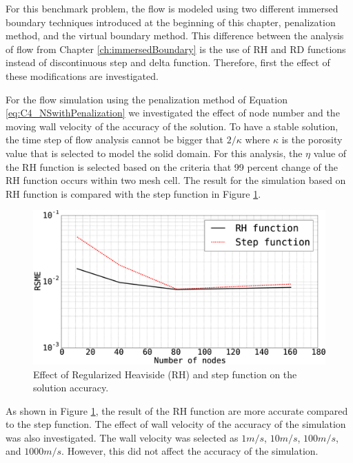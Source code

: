 For this benchmark problem, the flow is modeled using two different immersed boundary techniques introduced at the beginning of this chapter, penalization method, and the virtual boundary method. This difference between the analysis of flow from Chapter \ref{ch:immersedBoundary} is the use of RH and RD functions instead of discontinuous step and delta function. Therefore, first the effect of these modifications are investigated.

For the flow simulation using the penalization method of Equation \eqref{eq:C4_NSwithPenalization} we investigated the effect of node number and the moving wall velocity of the accuracy of the solution. To have a stable solution, the time step of flow analysis cannot be bigger that $2 / \kappa$ where $\kappa$ is the porosity value that is selected to model the solid domain. For this analysis, the $\eta$ value of the RH function is selected based on the criteria that 99 percent change of the RH function occurs within two mesh cell. The result for the simulation based on RH function is compared with the step function in Figure \ref{fig:C4_effectOfRHfunctionOnSimulationResults1Dproblem}.

\begin{figure}[H]
    \centering
    \includegraphics[width=12.00cm]{Chapter_4/figure/effect_of_RH_on_simulation_vs_numberOfNodes_1D_problem.eps}
    \caption{Effect of Regularized Heaviside (RH) and step function on the solution accuracy.}
    \label{fig:C4_effectOfRHfunctionOnSimulationResults1Dproblem}
\end{figure}

As shown in Figure \ref{fig:C4_effectOfRHfunctionOnSimulationResults1Dproblem}, the result of the RH function are more accurate compared to the step function. The effect of wall velocity of the accuracy of the simulation was also investigated. The wall velocity was selected as $1 m/s$, $10 m/s$, $100 m/s$, and $1000 m/s$. However, this did not affect the accuracy of the simulation.

